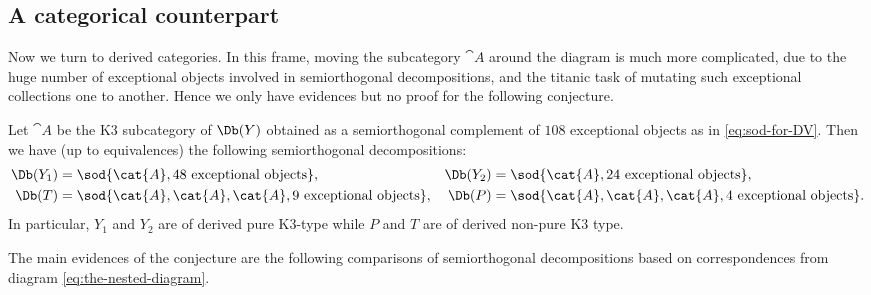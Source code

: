 \subsection{A categorical counterpart}
Now we turn to derived categories. In this frame, moving the subcategory $\cat{A}$ around the diagram is much more complicated, due to the huge number of exceptional objects involved in semiorthogonal decompositions, and the titanic task of mutating such exceptional collections one to another. Hence we only have evidences but no proof for the following conjecture.

\begin{conjecture}\label{conj:decompositions}
Let $\cat{A}$ be the K3 subcategory of $\Db(Y)$ obtained as a semiorthogonal complement of $108$ exceptional objects as in \eqref{eq:sod-for-DV}.
Then we have (up to equivalences) the following semiorthogonal decompositions:\vspace*{-3pt}
\begin{align*}
\Db(Y_1)&=\sod{\cat{A}, 48 \text{ exceptional objects}},&
\Db(Y_2)&=\sod{\cat{A}, 24 \text{ exceptional objects}},\\
\Db(T)&=\sod{\cat{A},\cat{A},\cat{A}, 9 \text{ exceptional objects}},&
\Db(P)&=\sod{\cat{A},\cat{A},\cat{A}, 4 \text{ exceptional objects}}.
\end{align*}
In particular, $Y_1$ and $Y_2$ are of derived pure K3-type while $P$ and $T$ are of
derived non-pure K3 type.
\end{conjecture}

The main evidences of the conjecture are the following comparisons of semiorthogonal
decompositions based on correspondences from diagram \eqref{eq:the-nested-diagram}.

